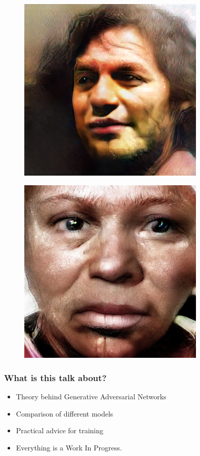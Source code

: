 \documentclass{Bredelebeamer}
\begin{document}
\begin{frame}
\begin{figure}[h!]
	\centering
	\includegraphics[width=0.8\textwidth]{4k_man.jpg}
\end{figure}
\end{frame}

\begin{frame}
\begin{figure}[h!]
	\centering
	\includegraphics[width=0.8\textwidth]{4k_black_woman.jpg}
\end{figure}
\end{frame}
\begin{frame}
\frametitle{What is this talk about?}
\begin{itemize}
	\item Theory behind Generative Adversarial Networks
	\item Comparison of different models
	\item Practical advice for training
	\item Everything is a Work In Progress.
\end{itemize}

\end{frame}
\end{document}

